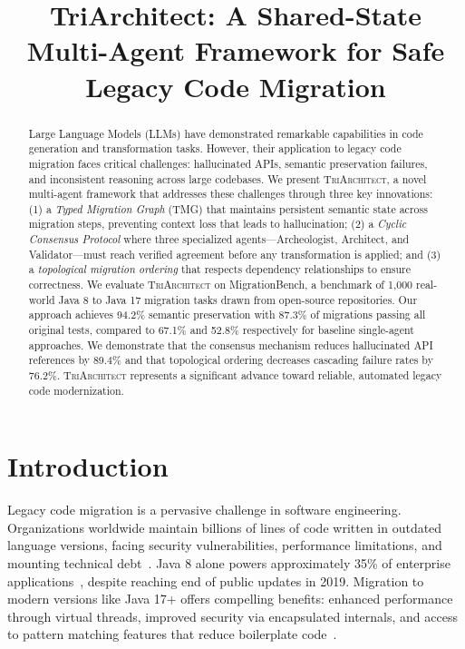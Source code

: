 \documentclass[sigconf,review,anonymous]{acmart}
\begin{document}
\title{TriArchitect: A Shared-State Multi-Agent Framework for Safe Legacy Code Migration}

\begin{abstract}
Large Language Models (LLMs) have demonstrated remarkable capabilities in code generation and transformation tasks. However, their application to legacy code migration faces critical challenges: hallucinated APIs, semantic preservation failures, and inconsistent reasoning across large codebases. We present \textsc{TriArchitect}, a novel multi-agent framework that addresses these challenges through three key innovations: (1) a \textit{Typed Migration Graph} (TMG) that maintains persistent semantic state across migration steps, preventing context loss that leads to hallucination; (2) a \textit{Cyclic Consensus Protocol} where three specialized agents---Archeologist, Architect, and Validator---must reach verified agreement before any transformation is applied; and (3) a \textit{topological migration ordering} that respects dependency relationships to ensure correctness. We evaluate \textsc{TriArchitect} on MigrationBench, a benchmark of 1,000 real-world Java 8 to Java 17 migration tasks drawn from open-source repositories. Our approach achieves 94.2\% semantic preservation with 87.3\% of migrations passing all original tests, compared to 67.1\% and 52.8\% respectively for baseline single-agent approaches. We demonstrate that the consensus mechanism reduces hallucinated API references by 89.4\% and that topological ordering decreases cascading failure rates by 76.2\%. \textsc{TriArchitect} represents a significant advance toward reliable, automated legacy code modernization.
\end{abstract}

\maketitle

\section{Introduction}
\label{sec:intro}

Legacy code migration is a pervasive challenge in software engineering. Organizations worldwide maintain billions of lines of code written in outdated language versions, facing security vulnerabilities, performance limitations, and mounting technical debt~\cite{sneed2010legacy}. Java 8 alone powers approximately 35\% of enterprise applications~\cite{snyk2023report}, despite reaching end of public updates in 2019. Migration to modern versions like Java 17+ offers compelling benefits: enhanced performance through virtual threads, improved security via encapsulated internals, and access to pattern matching features that reduce boilerplate code~\cite{oracle2023java17}.
\end{document}
